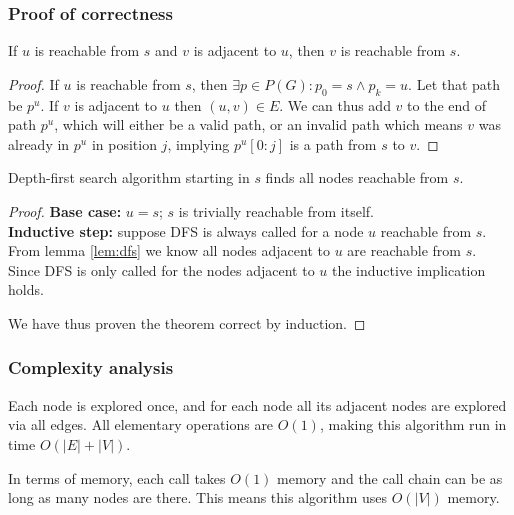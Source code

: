 \subsubsection{Proof of correctness}
\begin{lemma} \label{lem:dfs}
    If $u$ is reachable from $s$ and $v$ is adjacent to $u$, then $v$ is reachable from $s$.
\end{lemma}
\begin{proof}
    If $u$ is reachable from $s$, then $\exists p \in P(G) \colon p_0 = s \wedge p_k = u$. Let that path be $p^u$. If $v$ is adjacent to $u$ then $(u,v) \in E$. We can thus add $v$ to the end of path $p^u$, which will either be a valid path, or an invalid path which means $v$ was already in $p^u$ in position $j$, implying $p^u[0:j]$ is a path from $s$ to $v$.
\end{proof}
\begin{theorem}
    Depth-first search algorithm starting in $s$ finds all nodes reachable from $s$.
\end{theorem}
\begin{proof} \textbf{Base case:} $u=s$; $s$ is trivially reachable from itself. \\
\textbf{Inductive step:} suppose \textsc{DFS} is always called for a node $u$ reachable from $s$. From lemma \ref{lem:dfs} we know all nodes adjacent to $u$ are reachable from $s$. Since \textsc{DFS} is only called for the nodes adjacent to $u$ the inductive implication holds.\par
We have thus proven the theorem correct by induction.
\end{proof}
\subsubsection{Complexity analysis}
Each node is explored once, and for each node all its adjacent nodes are explored via all edges. All elementary operations are $O(1)$, making this algorithm run in time $O(|E|+|V|)$.\par
In terms of memory, each call takes $O(1)$ memory and the call chain can be as long as many nodes are there. This means this algorithm uses $O(|V|)$ memory.
